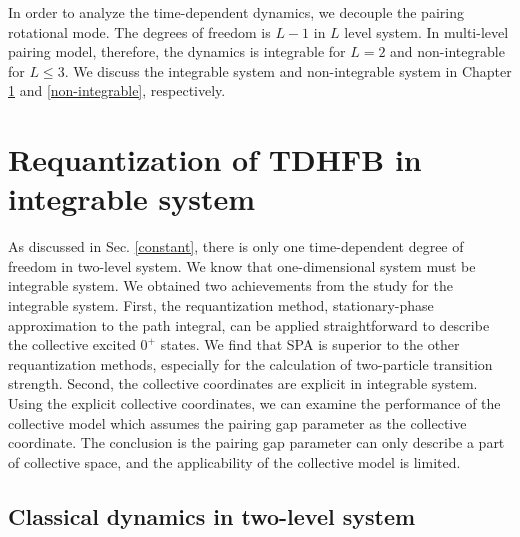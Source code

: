 \documentclass[11pt]{book} %
\begin{document}
In order to analyze the time-dependent dynamics, we decouple the pairing rotational mode. The degrees of freedom is $L-1$ in $L$ level system. In multi-level pairing model, therefore, the dynamics is integrable for $L=2$ and non-integrable for $L\le 3$. We discuss the integrable system and non-integrable system in Chapter \ref{integrable} and \ref{non-integrable}, respectively. 

\clearpage{\pagestyle{empty}\cleardoublepage}
\chapter{Requantization of TDHFB in integrable system}
\label{integrable}
As discussed in Sec. \ref{constant}, there is only one time-dependent degree of freedom in two-level system. We know that one-dimensional system must be integrable system.
We obtained two achievements from the study for the integrable system. First, the requantization method, stationary-phase approximation to the path integral, can be applied straightforward to describe the collective excited $0^+$ states. We find that SPA is superior to the other requantization methods, especially for the calculation of two-particle transition strength. Second, the collective coordinates are explicit in integrable system. Using the explicit collective coordinates, we can examine the performance of the collective model which assumes the pairing gap parameter as the collective coordinate. The conclusion is the pairing gap parameter can only describe a part of collective space, and the applicability of the collective model is limited.

\section{Classical dynamics in two-level system}
\end{document}
